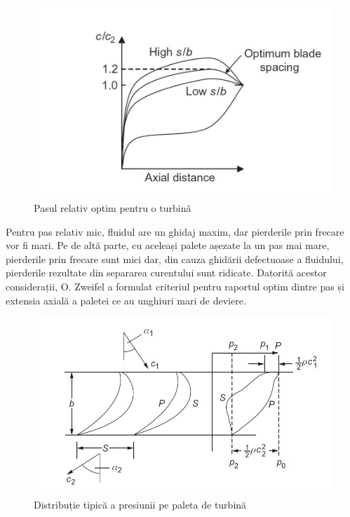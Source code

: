 \begin{figure}[h]
	\centering
	\includegraphics[scale=0.35]{figures/pasul_relativ_optim.jpg}
	\caption{Pasul relativ optim pentru o turbină \cite{hall2013fluid}}
	\label{Pasul relativ optim pentru o turbină}
\end{figure}

Pentru pas relativ mic, fluidul are un ghidaj maxim, dar pierderile prin frecare vor fi mari. Pe de altă parte, cu aceleași palete așezate la un pas mai mare, pierderile prin frecare sunt mici dar, din cauza ghidării defectuoase a fluidului, pierderile rezultate din separarea curentului sunt ridicate. Datorită acestor considerații, O. Zweifel \cite{zweifel1945frage} a formulat criteriul pentru raportul optim dintre pas și extensia axială a paletei ce au unghiuri mari de deviere.

\begin{figure}[h]
	\centering
	\includegraphics[scale=0.5]{figures/distributia_presiunii.jpg}
	\caption{Distribuție tipică a presiunii pe paleta de turbină \cite{hall2013fluid}}
	\label{Distribuție tipică a presiunii pe paleta de turbină}
\end{figure}

